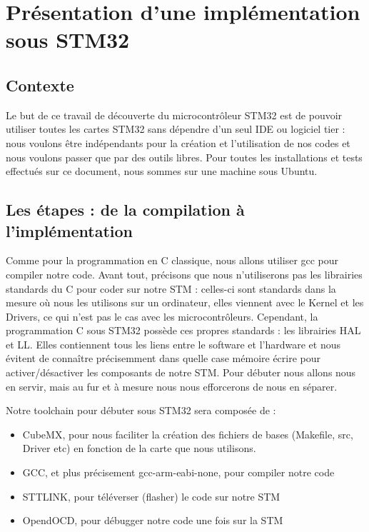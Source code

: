 \documentclass[11pt,french,a4paper]{report}
\begin{document}
\chapter{Présentation d'une implémentation sous STM32}
\section{Contexte}
Le but de ce travail de découverte du microcontrôleur STM32 est de pouvoir utiliser toutes les 
cartes STM32 sans dépendre d'un seul IDE ou logiciel tier : nous voulons être indépendants pour la création
et l'utilisation de nos codes et nous voulons passer que par des outils libres. 
Pour toutes les installations et tests effectués sur ce document, nous sommes sur une machine sous Ubuntu. 

\section{Les étapes : de la compilation à l'implémentation}
Comme pour la programmation en C classique, nous allons utiliser gcc pour compiler notre code. 
Avant tout, précisons que nous n'utiliserons pas les librairies standards du C pour coder sur notre STM : 
celles-ci sont standards dans la mesure où nous les utilisons sur un ordinateur, elles viennent avec le Kernel et 
les Drivers, ce qui n'est pas le cas avec les microcontrôleurs. 
Cependant, la programmation C sous STM32 possède ces propres standards : les librairies HAL et LL. Elles contiennent 
tous les liens entre le software et l'hardware et nous évitent de connaître précisemment dans quelle case 
mémoire écrire pour activer/désactiver les composants de notre STM. 
Pour débuter nous allons nous en servir, mais au fur et à mesure nous nous efforcerons de nous en séparer. 

Notre toolchain pour débuter sous STM32 sera composée de : 

\begin{itemize}
    \item CubeMX, pour nous faciliter la création des fichiers de bases (Makefile, src, Driver etc) en fonction de la carte
    que nous utilisons. 
    \item GCC, et plus précisement gcc-arm-eabi-none, pour compiler notre code
    \item STTLINK, pour téléverser (flasher) le code sur notre STM
    \item OpendOCD, pour débugger notre code une fois sur la STM
\end{itemize}
\end{document}
